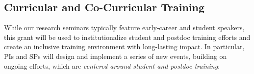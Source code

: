 \documentclass[11pt]{NSFamsart}
\newcommand{\FredNote}[1]{{\color{blue} Fred: #1}}
\begin{document}

 


\subsection{Curricular and Co-Curricular Training}\label{section: co-curricular}

While our research seminars  typically feature early-career and student speakers, this grant will be used to institutionalize student and postdoc training  efforts and create an inclusive training environment with long-lasting impact. %
In particular,  PIs and SPs will  design and implement a  series of new events, building on  ongoing efforts, which are \emph{centered around student and postdoc training}: 
\end{document}
